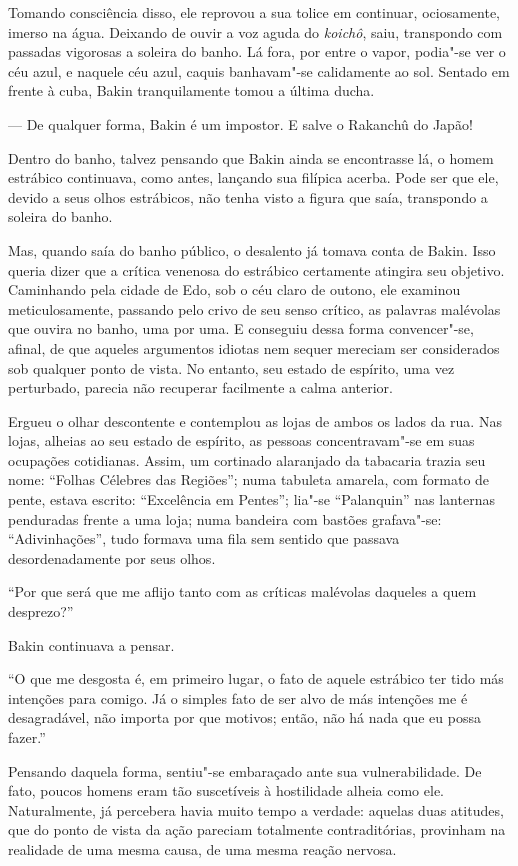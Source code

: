 Tomando consciência disso, ele reprovou a sua tolice em continuar,
ociosamente, imerso na água. Deixando de ouvir a voz aguda do
\textit{koichô}, saiu, transpondo com passadas vigorosas a soleira do
banho. Lá fora, por entre o vapor, podia"-se ver o céu azul, e naquele
céu azul, caquis banhavam"-se calidamente ao sol. Sentado em frente à
cuba, Bakin tranquilamente tomou a última ducha.

--- De qualquer forma, Bakin é um impostor. E salve o Rakanchû do Japão!

Dentro do banho, talvez pensando que Bakin ainda se encontrasse lá, o
homem estrábico continuava, como antes, lançando sua filípica acerba.
Pode ser que ele, devido a seus olhos estrábicos, não tenha visto a
figura que saía, transpondo a soleira do banho.

\sectionitem
Mas, quando saía do banho público, o desalento já tomava conta de Bakin.
Isso queria dizer que a crítica venenosa do estrábico certamente
atingira seu objetivo. Caminhando pela cidade de Edo, sob o céu claro
de outono, ele examinou meticulosamente, passando pelo crivo de seu
senso crítico, as palavras malévolas que ouvira no banho, uma por uma.
E  conseguiu dessa forma convencer"-se, afinal, de que aqueles 
argumentos idiotas nem sequer mereciam ser considerados sob qualquer
ponto de vista. No entanto, seu estado de espírito, uma vez perturbado,
parecia não recuperar facilmente a calma anterior.

Ergueu o olhar descontente e contemplou as lojas de ambos os lados da
rua. Nas lojas, alheias ao seu estado de espírito, as pessoas
concentravam"-se em suas ocupações cotidianas. 
Assim, um cortinado alaranjado da tabacaria trazia seu nome: 
``Folhas Célebres das Regiões''; numa tabuleta amarela, com formato de pente, 
estava escrito: ``Excelência em Pentes''; lia"-se ``Palanquin'' nas lanternas 
penduradas frente a uma loja; numa bandeira com bastões grafava"-se: ``Adivinhações'', 
tudo formava uma fila sem sentido que passava desordenadamente por seus olhos.

``Por que será que me aflijo tanto com as críticas malévolas daqueles a
quem desprezo?''

Bakin continuava a pensar.

``O que me desgosta é, em primeiro lugar, o fato de aquele estrábico ter
tido más intenções para comigo. Já o simples fato de ser alvo de más
intenções me é desagradável, não importa por que motivos; então, não há
nada que eu possa fazer.''

Pensando daquela forma, sentiu"-se embaraçado ante sua vulnerabilidade.
De fato, poucos homens eram tão suscetíveis à hostilidade alheia como
ele. Naturalmente, já percebera havia muito tempo a verdade: aquelas
duas atitudes, que do ponto de vista da ação pareciam totalmente
contraditórias, provinham na realidade de uma mesma causa, de uma mesma 
reação nervosa.

